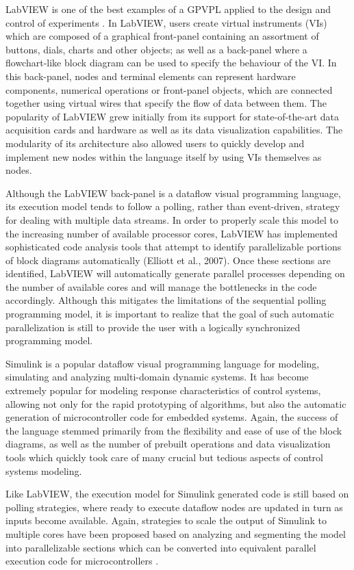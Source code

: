 LabVIEW is one of the best examples of a GPVPL applied to the design and control of experiments \cite{Elliott2007}. In LabVIEW, users create virtual instruments (VIs) which are composed of a graphical front-panel containing an assortment of buttons, dials, charts and other objects; as well as a back-panel where a flowchart-like block diagram can be used to specify the behaviour of the VI. In this back-panel, nodes and terminal elements can represent hardware components, numerical operations or front-panel objects, which are connected together using virtual wires that specify the flow of data between them. The popularity of LabVIEW grew initially from its support for state-of-the-art data acquisition cards and hardware as well as its data visualization capabilities. The modularity of its architecture also allowed users to quickly develop and implement new nodes within the language itself by using VIs themselves as nodes.

Although the LabVIEW back-panel is a dataflow visual programming language, its execution model tends to follow a polling, rather than event-driven, strategy for dealing with multiple data streams. In order to properly scale this model to the increasing number of available processor cores, LabVIEW has implemented sophisticated code analysis tools that attempt to identify parallelizable portions of block diagrams automatically (Elliott et al., 2007). Once these sections are identified, LabVIEW will automatically generate parallel processes depending on the number of available cores and will manage the bottlenecks in the code accordingly. Although this mitigates the limitations of the sequential polling programming model, it is important to realize that the goal of such automatic parallelization is still to provide the user with a logically synchronized programming model.

Simulink is a popular dataflow visual programming language for modeling, simulating and analyzing multi-domain dynamic systems. It has become extremely popular for modeling response characteristics of control systems, allowing not only for the rapid prototyping of algorithms, but also the automatic generation of microcontroller code for embedded systems. Again, the success of the language stemmed primarily from the flexibility and ease of use of the block diagrams, as well as the number of prebuilt operations and data visualization tools which quickly took care of many crucial but tedious aspects of control systems modeling.

Like LabVIEW, the execution model for Simulink generated code is still based on polling strategies, where ready to execute dataflow nodes are updated in turn as inputs become available. Again, strategies to scale the output of Simulink to multiple cores have been proposed based on analyzing and segmenting the model into parallelizable sections which can be converted into equivalent parallel execution code for microcontrollers \cite{Kumura2012}.

